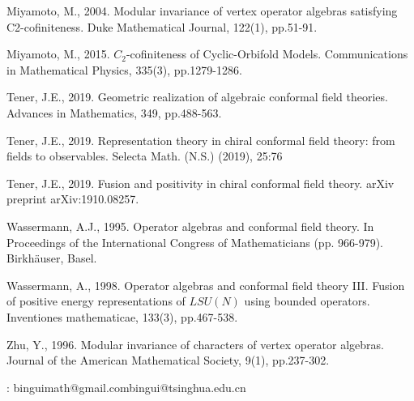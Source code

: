 \documentclass[12pt,a4paper,notitlepage]{article}
\theoremstyle{definition}
\theoremstyle{plain}
\numberwithin{equation}{subsection}
\begin{document}
\begin{thebibliography}{999999}
Miyamoto, M., 2004. Modular invariance of vertex operator algebras satisfying C2-cofiniteness. Duke Mathematical Journal, 122(1), pp.51-91.

Miyamoto, M., 2015. $C_2$-cofiniteness of Cyclic-Orbifold Models. Communications in Mathematical Physics, 335(3), pp.1279-1286.



Tener, J.E., 2019. Geometric realization of algebraic conformal field theories. Advances in Mathematics, 349, pp.488-563.


Tener, J.E., 2019. Representation theory in chiral conformal field theory: from fields to
observables. Selecta Math. (N.S.) (2019), 25:76

Tener, J.E., 2019. Fusion and positivity in chiral conformal field theory. arXiv preprint arXiv:1910.08257.


Wassermann, A.J., 1995. Operator algebras and conformal field theory. In Proceedings of the International Congress of Mathematicians (pp. 966-979). Birkhäuser, Basel.


Wassermann, A., 1998. Operator algebras and conformal field theory III. Fusion of positive energy representations of $LSU(N)$ using bounded operators. Inventiones mathematicae, 133(3), pp.467-538.


Zhu, Y., 1996. Modular invariance of characters of vertex operator algebras. Journal of the American Mathematical Society, 9(1), pp.237-302.	
		
		
\end{thebibliography}


: binguimath@gmail.com\qquad bingui@tsinghua.edu.cn
\end{document}
